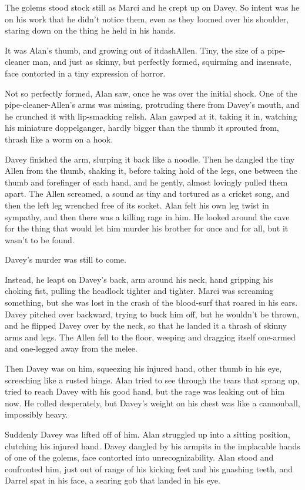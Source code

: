 The golems stood stock still as Marci and he crept up on Davey.  So
intent was he on his work that he didn't notice them, even as they
loomed over his shoulder, staring down on the thing he held in his
hands.

It was Alan's thumb, and growing out of itdash{}Allen.  Tiny, the size of
a pipe-cleaner man, and just as skinny, but perfectly formed,
squirming and insensate, face contorted in a tiny expression of
horror.

Not so perfectly formed, Alan saw, once he was over the initial shock. 
One of the pipe-cleaner-Allen's arms was missing, protruding there
from Davey's mouth, and he crunched it with lip-smacking relish.  Alan
gawped at it, taking it in, watching his miniature doppelganger,
hardly bigger than the thumb it sprouted from, thrash like a worm on a
hook.

Davey finished the arm, slurping it back like a noodle.  Then he
dangled the tiny Allen from the thumb, shaking it, before taking hold
of the legs, one between the thumb and forefinger of each hand, and he
gently, almost lovingly pulled them apart.  The Allen screamed, a
sound as tiny and tortured as a cricket song, and then the left leg
wrenched free of its socket.  Alan felt his own leg twist in sympathy,
and then there was a killing rage in him.  He looked around the cave
for the thing that would let him murder his brother for once and for
all, but it wasn't to be found.

Davey's murder was still to come.

Instead, he leapt on Davey's back, arm around his neck, hand gripping
his choking fist, pulling the headlock tighter and tighter.  Marci was
screaming something, but she was lost in the crash of the blood-surf
that roared in his ears.  Davey pitched over backward, trying to buck
him off, but he wouldn't be thrown, and he flipped Davey over by the
neck, so that he landed it a thrash of skinny arms and legs.  The
Allen fell to the floor, weeping and dragging itself one-armed and
one-legged away from the melee.

Then Davey was on him, squeezing his injured hand, other thumb in his
eye, screeching like a rusted hinge.  Alan tried to see through the
tears that sprang up, tried to reach Davey with his good hand, but the
rage was leaking out of him now.  He rolled desperately, but Davey's
weight on his chest was like a cannonball, impossibly heavy.

Suddenly Davey was lifted off of him.  Alan struggled up into a
sitting position, clutching his injured hand.  Davey dangled by his
armpits in the implacable hands of one of the golems, face contorted
into unrecognizability.  Alan stood and confronted him, just out of
range of his kicking feet and his gnashing teeth, and Darrel spat in
his face, a searing gob that landed in his eye.

